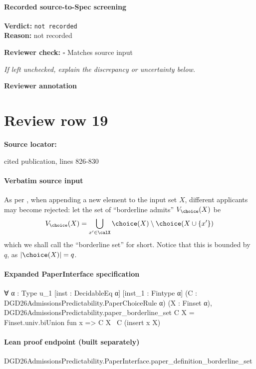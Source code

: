 \documentclass[10pt]{article}
\newcommand{\reviewerbox}{%
  \par\noindent\fbox{\parbox{0.96\linewidth}{\rule{0pt}{0.38in}}}\par
}
\newcommand{\reviewmatch}[1]{%
  \par\noindent\textbf{Reviewer check:} $\square$\; #1\par
  \noindent\emph{If left unchecked, explain the discrepancy or uncertainty below.}\par
}
\begin{document}
\paragraph{Recorded source-to-Spec screening}
\textbf{Verdict:} \texttt{not recorded}
\\
\textbf{Reason:} not recorded
\reviewmatch{Matches source input}
\noindent\textbf{Reviewer annotation}\par
\reviewerbox
\clearpage
\hypertarget{source-claim-8e553b3e026d261e}{}
\section*{Review row 19}
\textbf{Source locator:} {\footnotesize\raggedright cited publication, lines 826-\allowbreak{}830\par}
\paragraph{Verbatim source input}
\begin{ReviewVerbatim}
As per , when appending a new element to the input set $X$, different applicants may become rejected: let the set of ``borderline admits'' $V_\choice(X)$ be
\begin{equation}
V_\choice(X) = \bigcup\limits_{x'\in\calX} \choice(X) \setminus \choice(X \cup \{x'\})
\end{equation}
which we shall call the ``borderline set'' for short. Notice that this is bounded by $q$, as $|\choice(X)| = q$.
\end{ReviewVerbatim}


\paragraph{Expanded PaperInterface specification}
\begin{ReviewVerbatim}
∀ {α : Type u_1} [inst : DecidableEq α] [inst_1 : Fintype α] (C : DGD26AdmissionsPredictability.PaperChoiceRule α)
  (X : Finset α),
  DGD26AdmissionsPredictability.paper_borderline_set C X = Finset.univ.biUnion fun x => C X \ C (insert x X)
\end{ReviewVerbatim}

\paragraph{Lean proof endpoint (built separately)}\begin{ReviewVerbatim}
DGD26AdmissionsPredictability.PaperInterface.paper_definition_borderline_set
\end{ReviewVerbatim}
\end{document}
